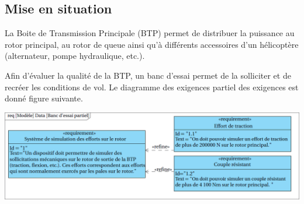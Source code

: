 \documentclass[10pt,fleqn]{article} %
\begin{document}

\vspace{4.5cm}
\pagestyle{fancy}
\thispagestyle{plain}


\def\columnseprulecolor{\color{ocre}}
\setlength{\columnseprule}{0.4pt} 

\begin{multicols}{2}
\section*{Mise en situation}



La Boite de Transmission Principale (BTP) permet de distribuer la puissance au
rotor principal, au rotor de queue ainsi qu’à différents accessoires d'un hélicoptère (alternateur, pompe
hydraulique, etc.).



Afin d’évaluer la qualité de la BTP, un banc d’essai permet de la
solliciter et de recréer les conditions de vol. Le diagramme des exigences partiel des exigences est donné figure suivante.


\begin{center}
\includegraphics[width=\linewidth]{images/fig_02}
\end{center}
%


\end{multicols}
\end{document}
